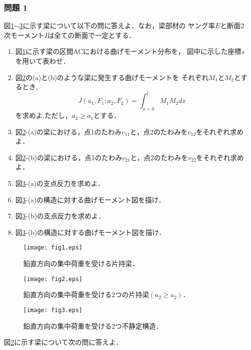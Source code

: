 \documentclass[10pt,a4j]{jarticle}
\begin{document}
\subsubsection*{問題 1}
図\ref{fig:fig1}$\sim$\ref{fig:fig3}に示す梁について以下の問に答えよ．なお，梁部材の
ヤング率$E$と断面2次モーメント$I$は全ての断面で一定とする．
\begin{enumerate}
\item
	図\ref{fig:fig1}に示す梁の区間ACにおける曲げモーメント分布を，
	図中に示した座標$s$を用いて表わせ．
\item
	図\ref{fig:fig2}の(a)と(b)のような梁に発生する曲げモーメントを
	それぞれ$M_1$と$M_2$とするとき,
	\begin{equation}
		J(a_1,F_1;a_2,F_2)=\int_{x=0}^{l}M_1M_2 dx
	\end{equation}
	を求めよ.ただし，$a_2\geq a_1$とする．
\item
	図\ref{fig:fig2}-(a)の梁における，点1のたわみ$v_{11}$と，点2のたわみを$v_{12}$をそれぞれ求めよ．
\item
	図\ref{fig:fig2}-(b)の梁における，点1のたわみ$v_{21}$と，点2のたわみを$v_{22}$をそれぞれ求めよ．
\item
	図\ref{fig:fig3}-(a)の支点反力を求めよ．
\item
	図\ref{fig:fig3}-(a)の構造に対する曲げモーメント図を描け．
\item
	図\ref{fig:fig3}-(b)の支点反力を求めよ．
\item
	図\ref{fig:fig3}-(b)の構造に対する曲げモーメント図を描け．
\end{enumerate}
\begin{figure}[h]
	\begin{center}
	\texttt{[image: fig1.eps]} 
	\end{center}
	\caption{鉛直方向の集中荷重を受ける片持梁．} 
	\label{fig:fig1}
\end{figure}
\begin{figure}[h]
	\begin{center}
	\texttt{[image: fig2.eps]} 
	\end{center}
	\caption{鉛直方向の集中荷重を受ける2つの片持梁$(a_2\geq a_2)$．} 
	\label{fig:fig2}
\end{figure}
\begin{figure}[h]
	\begin{center}
	\texttt{[image: fig3.eps]} 
	\end{center}
	\caption{鉛直方向の集中荷重を受ける2つ不静定構造．} 
	\label{fig:fig3}
\end{figure}
図\ref{fig:fig2}に示す梁について次の問に答えよ．
\end{document}
